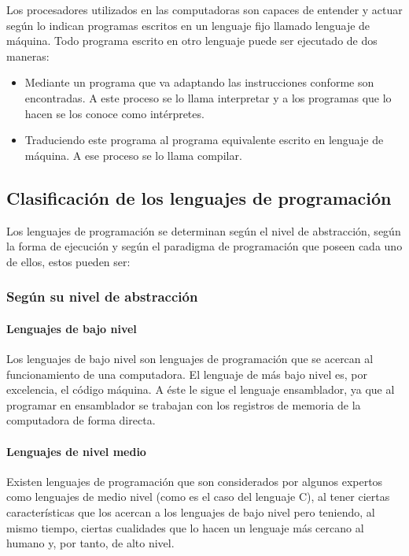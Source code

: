 \documentclass[12pt,legalpaper]{report}
\begin{document}
Los procesadores utilizados en las computadoras son capaces de entender y actuar según lo indican programas escritos en un lenguaje fijo llamado lenguaje de máquina. Todo programa escrito en otro lenguaje puede ser ejecutado de dos maneras:

\begin{itemize}
	\item Mediante un programa que va adaptando las instrucciones conforme son encontradas. A este proceso se lo llama interpretar y a los programas que lo hacen se los conoce como intérpretes.
	\item Traduciendo este programa al programa equivalente escrito en lenguaje de máquina. A ese proceso se lo llama compilar.
\end{itemize}

		\subsection{Clasificación de los lenguajes de programación}

Los lenguajes de programación se determinan según el nivel de abstracción, según la forma de ejecución y según el paradigma de programación que poseen cada uno de ellos, estos pueden ser:

			\subsubsection{Según su nivel de abstracción}

				\paragraph{Lenguajes de bajo nivel}

Los lenguajes de bajo nivel son lenguajes de programación que se acercan al funcionamiento de una computadora. El lenguaje de más bajo nivel es, por excelencia, el código máquina. A éste le sigue el lenguaje ensamblador, ya que al programar en ensamblador se trabajan con los registros de memoria de la computadora de forma directa.

				\paragraph{Lenguajes de nivel medio}

Existen lenguajes de programación que son considerados por algunos expertos como lenguajes de medio nivel (como es el caso del lenguaje C), al tener ciertas características que los acercan a los lenguajes de bajo nivel pero teniendo, al mismo tiempo, ciertas cualidades que lo hacen un lenguaje más cercano al humano y, por tanto, de alto nivel.
\end{document}
